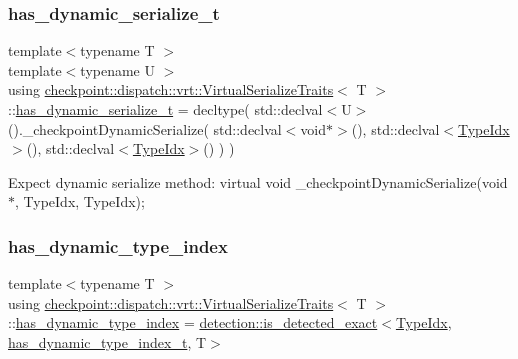 \subsubsection{\texorpdfstring{has\+\_\+dynamic\+\_\+serialize\+\_\+t}{has\_dynamic\_serialize\_t}}
{\footnotesize\ttfamily template$<$typename T $>$ \\
template$<$typename U $>$ \\
using \hyperlink{structcheckpoint_1_1dispatch_1_1vrt_1_1_virtual_serialize_traits}{checkpoint\+::dispatch\+::vrt\+::\+Virtual\+Serialize\+Traits}$<$ T $>$\+::\hyperlink{structcheckpoint_1_1dispatch_1_1vrt_1_1_virtual_serialize_traits_a5b78afee2cf468bf3fedddb017c9aad0}{has\+\_\+dynamic\+\_\+serialize\+\_\+t} =  decltype( std\+::declval$<$U$>$().\+\_\+checkpoint\+Dynamic\+Serialize( std\+::declval$<$void$\ast$$>$(), std\+::declval$<$\hyperlink{namespacecheckpoint_1_1dispatch_1_1vrt_acd3f9e6b091bcfbc23dc35ea8ef45d3b}{Type\+Idx}$>$(), std\+::declval$<$\hyperlink{namespacecheckpoint_1_1dispatch_1_1vrt_acd3f9e6b091bcfbc23dc35ea8ef45d3b}{Type\+Idx}$>$() ) )}

Expect dynamic serialize method\+: virtual void \+\_\+checkpoint\+Dynamic\+Serialize(void$\ast$, Type\+Idx, Type\+Idx); \mbox{\label{structcheckpoint_1_1dispatch_1_1vrt_1_1_virtual_serialize_traits_a5eb693a371780ee8f5e81a825e62bd5d}} 
\subsubsection{\texorpdfstring{has\+\_\+dynamic\+\_\+type\+\_\+index}{has\_dynamic\_type\_index}}
{\footnotesize\ttfamily template$<$typename T $>$ \\
using \hyperlink{structcheckpoint_1_1dispatch_1_1vrt_1_1_virtual_serialize_traits}{checkpoint\+::dispatch\+::vrt\+::\+Virtual\+Serialize\+Traits}$<$ T $>$\+::\hyperlink{structcheckpoint_1_1dispatch_1_1vrt_1_1_virtual_serialize_traits_a5eb693a371780ee8f5e81a825e62bd5d}{has\+\_\+dynamic\+\_\+type\+\_\+index} =  \hyperlink{namespacedetection_affc661f546e50448d9582e54280f7a11}{detection\+::is\+\_\+detected\+\_\+exact}$<$\hyperlink{namespacecheckpoint_1_1dispatch_1_1vrt_acd3f9e6b091bcfbc23dc35ea8ef45d3b}{Type\+Idx}, \hyperlink{structcheckpoint_1_1dispatch_1_1vrt_1_1_virtual_serialize_traits_a6a4e72c1d80374001f122c17ac1cc0e8}{has\+\_\+dynamic\+\_\+type\+\_\+index\+\_\+t}, T$>$}

